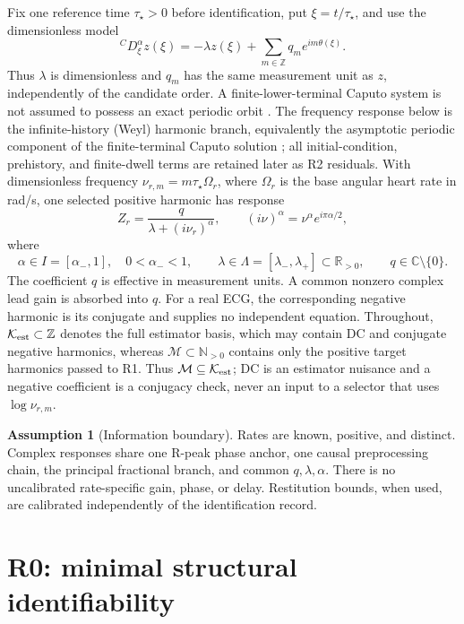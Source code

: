 \documentclass[11pt]{article}
\theoremstyle{definition}
\newtheorem{assumption}[theorem]{Assumption}
\theoremstyle{remark}
\newcommand{\C}{\mathbb C}
\newcommand{\R}{\mathbb R}
\newcommand{\Mset}{\mathcal M}
\newcommand{\Kset}{\mathcal K_{\rm est}}
\begin{document}
Fix one reference time \(\tau_\star>0\) before identification, put
\(\xi=t/\tau_\star\), and use the dimensionless model
\begin{equation}
 {}^C D_\xi^\alpha z(\xi)
 =-\lambda z(\xi)+\sum_{m\in\mathbb Z}q_m e^{im\theta(\xi)}.
 \label{eq:time-model}
\end{equation}
Thus \(\lambda\) is dimensionless and \(q_m\) has the same measurement unit as
\(z\), independently of the candidate order.  A finite-lower-terminal Caputo
system is not assumed to possess an exact periodic orbit
\cite{tavazoei2009}.  The frequency response below is the infinite-history
(Weyl) harmonic branch, equivalently the asymptotic periodic component of the
finite-terminal Caputo solution \cite{duan2022}; all initial-condition,
prehistory, and finite-dwell terms are retained later as R2 residuals.  With
dimensionless frequency \(\nu_{r,m}=m\tau_\star\Omega_r\), where \(\Omega_r\)
is the base angular heart rate in rad/s, one selected positive harmonic has
response
\begin{equation}
 Z_r=\frac{q}{\lambda+(i\nu_r)^\alpha},\qquad
 (i\nu)^\alpha=\nu^\alpha e^{i\pi\alpha/2},
 \label{eq:model}
\end{equation}
where
\[
 \alpha\in I=[\alpha_-,1],\quad 0<\alpha_-<1,\qquad
 \lambda\in\Lambda=[\lambda_-,\lambda_+]\subset\R_{>0},\qquad
 q\in\C\setminus\{0\}.
\]
The coefficient \(q\) is effective in measurement units.  A common nonzero
complex lead gain is absorbed into \(q\).  For a real ECG, the corresponding
negative harmonic is its conjugate and supplies no independent equation.
Throughout, \(\Kset\subset\mathbb Z\) denotes the full estimator basis, which
may contain DC and conjugate negative harmonics, whereas
\(\Mset\subset\mathbb N_{>0}\) contains only the positive target harmonics
passed to R1.  Thus \(\Mset\subseteq\Kset\); DC is an estimator nuisance and a
negative coefficient is a conjugacy check, never an input to a selector that
uses \(\log\nu_{r,m}\).

\begin{assumption}[Information boundary]
\label{ass:protocol}
Rates are known, positive, and distinct.  Complex responses share one R-peak
phase anchor, one causal preprocessing chain, the principal fractional branch,
and common \(q,\lambda,\alpha\).  There is no uncalibrated rate-specific gain,
phase, or delay.  Restitution bounds, when used, are calibrated independently
of the identification record.
\end{assumption}

\section{R0: minimal structural identifiability}
\end{document}
